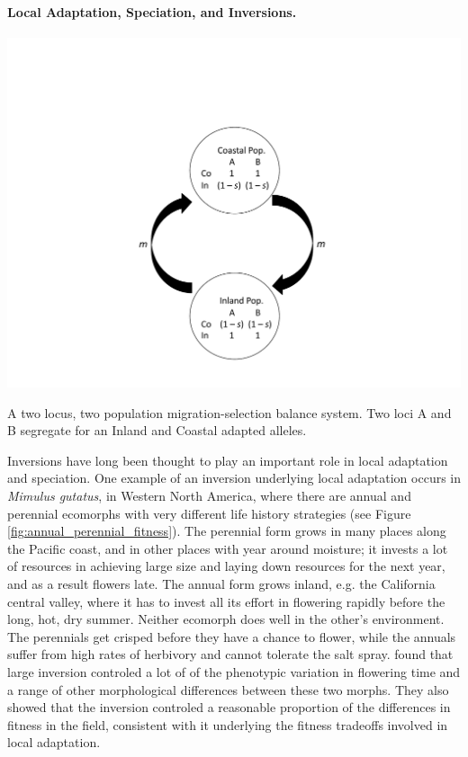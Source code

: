 \paragraph{Local Adaptation, Speciation, and Inversions.}
\begin{marginfigure} %
\begin{center}
\includegraphics[width = \textwidth]{figures/inversion_mig_sel_balance.pdf}
\end{center}
\caption{A two locus, two population migration-selection balance system. Two loci A and B segregate for an Inland and Coastal adapted alleles.} \label{two_locus_mig}
\end{marginfigure}
Inversions have long been thought to play an important role in local adaptation and speciation.
One example of an inversion underlying local adaptation occurs in {\it Mimulus gutatus},  in Western North America, where there are annual and perennial ecomorphs with very different life history strategies (see Figure \ref{fig:annual_perennial_fitness}). The perennial form grows in many places along the Pacific coast, and in other places with year around moisture; it invests a lot of resources in
achieving large size and laying down resources for the next year, and as a result flowers late. The annual form grows inland, e.g. the California central valley,
where it has to invest all its effort in flowering rapidly before the long, hot, dry summer. Neither ecomorph does well in the other's environment. The perennials get crisped
before they have a chance to flower, while the annuals suffer from high rates of herbivory and cannot tolerate the salt spray.
\citet{lowry2010widespread} found that large inversion controled a lot of of the phenotypic variation in
flowering time and a range of other morphological differences between these two morphs. They also showed that the inversion controled a reasonable proportion of the
differences in fitness in the field, consistent with it underlying the fitness tradeoffs involved in local adaptation.

